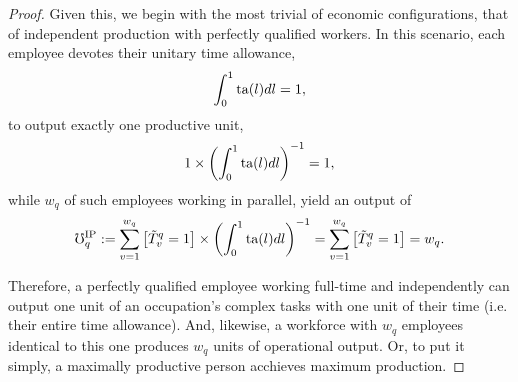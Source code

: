 \documentclass[hidelinks, nonatbib]{elsarticle}
\begin{document}
\begin{lemma}
\begin{proof}
        Given this, we begin with the most trivial of economic configurations, that of independent production with perfectly qualified workers. In this scenario, each employee devotes their unitary time allowance,
        \begin{gather}
            \int_{0}^{1}{
                \text{ta}(l)
                dl
            }
            =
            1
            ,
        \end{gather}
        to output exactly one productive unit,
        \begin{gather}
            1
            \times
            \left(
                \int_{0}^{1}{
                    \text{ta}(l)dl
                }
            \right) ^ {-1}
            =
            1
            ,
        \end{gather}
        while $w_q$ of such employees working in parallel, yield an output of
        \begin{gather}
            \mho_{q}^{\text{IP}}
            :=
            \sum_{v=1}^{w_q}{
                \left[
                    \tilde{T}_{v}^{q}
                    =
                    1
                \right]
                \times
                \left(
                    \int_{0}^{1}{
                        \text{ta}(l)
                        dl
                    }
                \right) ^ {-1}
            }
            =
            \sum_{v=1}^{w_q}{
                \left[
                    \tilde{T}_{v}^{q}
                    =
                    1
                \right]
            }
            =
            w_q
            .
        \end{gather}

        Therefore, a perfectly qualified employee working full-time and independently can output one unit of an occupation's complex tasks with one unit of their time (i.e. their entire time allowance). And, likewise, a workforce with $w_q$ employees identical to this one produces $w_q$ units of operational output. Or, to put it simply, a maximally productive person acchieves maximum production.
        

\end{proof}
\end{lemma}
\end{document}
